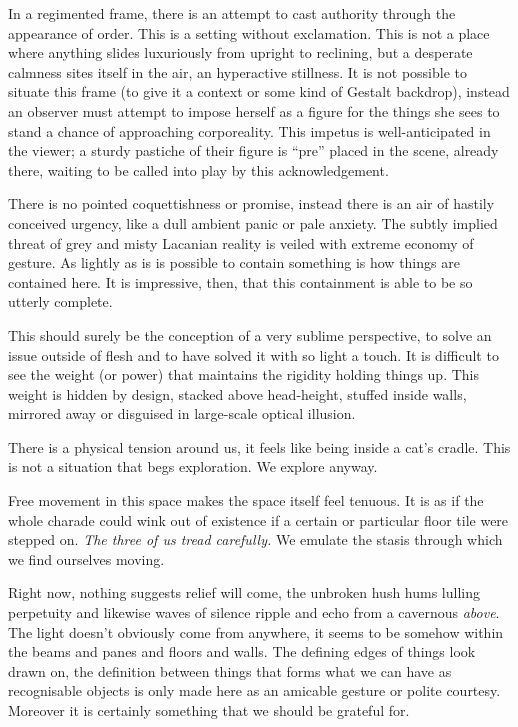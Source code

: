 \documentclass{book}
\begin{document}
In a regimented frame, there is an attempt to cast authority through the
appearance of order. This is a setting without exclamation. This is not a place
where anything slides luxuriously from upright to reclining, but a desperate
calmness sites itself in the air, an hyperactive stillness. It is not possible
to situate this frame (to give it a context or some kind of Gestalt backdrop),
instead an observer must attempt to impose herself as a figure for the things
she sees to stand a chance of approaching corporeality. This impetus is
well-anticipated in the viewer; a sturdy pastiche of their figure is ``pre''
placed in the scene, already there, waiting to be called into play by this
acknowledgement.

There is no pointed coquettishness or promise, instead there is an air of
hastily conceived urgency, like a dull ambient panic or pale anxiety. The
subtly implied threat of grey and misty Lacanian reality is veiled with extreme
economy of gesture. As lightly as is is possible to contain something is how
things are contained here. It is impressive, then, that this containment is
able to be so utterly complete.

This should surely be the conception of a very sublime perspective, to solve an
issue outside of flesh and to have solved it with so light a touch. It is
difficult to see the weight (or power) that maintains the rigidity holding
things up.  This weight is hidden by design, stacked above head-height, stuffed
inside walls, mirrored away or disguised in large-scale optical illusion.

There is a physical tension around us, it feels like being inside a cat's
cradle. This is not a situation that begs exploration. We explore anyway.

Free movement in this space makes the space itself feel tenuous. It is as if
the whole charade could wink out of existence if a certain or particular floor
tile were stepped on.  \emph{The three of us tread carefully.} We emulate the
stasis through which we find ourselves moving.

Right now, nothing suggests relief will come, the unbroken hush hums lulling
perpetuity and likewise waves of silence ripple and echo from a cavernous
\emph{above}.  The light doesn't obviously come from anywhere, it seems to be
somehow within the beams and panes and floors and walls. The defining edges of
things look drawn on, the definition between things that forms what we can have
as recognisable objects is only made here as an amicable gesture or polite
courtesy. Moreover it is certainly something that we should be grateful for.
\end{document}
